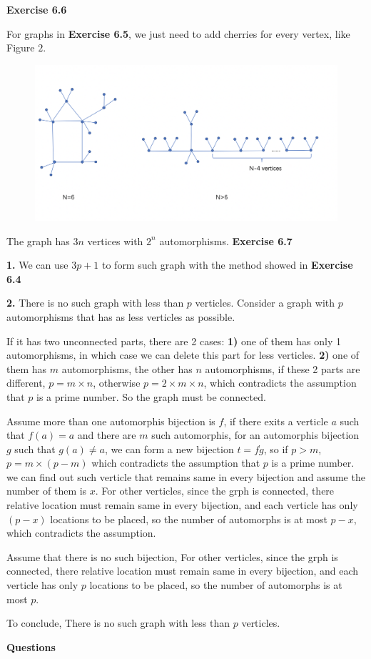 \documentclass{article} %
\begin{document}
	\textbf{Exercise 6.6}\par
	For graphs in \textbf{Exercise 6.5}, we just need to add cherries for every vertex, like Figure $2$.
	\begin{figure}[H]
  	\centering
  	\includegraphics[scale=0.4]{6.6.png}
  	\caption{}
  	\label{fig:1}
  	\end{figure}
	The graph has $3n$ vertices with $2^{n}$ automorphisms.
	\textbf{Exercise 6.7}\par
	\textbf{1.} We can use $3p+1$ to form such graph with the method showed in \textbf{Exercise 6.4}\par
	\textbf{2.} There is no such graph with less than $p$ verticles. Consider a graph with $p$ automorphisms that has as less verticles as possible.\par 
	If it has two unconnected parts, there are 2 cases: \textbf{1)} one of them has only 1 automorphisms, in which case we can delete this part for less verticles. \textbf{2)} one of them has $m$  automorphisms, the other has $n$ automorphisms, if these 2 parts are different, $p=m \times n$, otherwise $p=2\times m\times n$, which contradicts the assumption that $p$ is a prime number. So the graph must be connected.\par 
	Assume more than one automorphis bijection is $f$, if there exits a verticle $a$ such that $f(a)=a$ and there are $m$ such automorphis, for an automorphis bijection $g$ such that $g(a) \not=a$, we can form a new bijection $t=f \dot g$, so if $p>m$,$p=m\times (p-m) $  
	which contradicts the assumption that $p$ is a prime number. we can find out such verticle that remains same in every bijection and assume the number of them is $x$. For other verticles, since the grph is connected, there relative location must remain same in every bijection, and each verticle has only $(p-x)$ locations to be placed, so the number of automorphs is at most $p-x$, which contradicts the assumption. \par
	Assume that there is no such bijection, For other verticles, since the grph is connected, there relative location must remain same in every bijection, and each verticle has only $p$ locations to be placed, so the number of automorphs is at most $p$.\par
	To conclude, There is no such graph with less than $p$ verticles.	


	\textbf{Questions}\par
	
\end{document}
